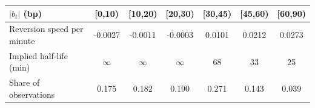 \begin{tabular}{lcccccc}
\toprule
$|b_t|$ (bp) & [0,10) & [10,20) & [20,30) & [30,45) & [45,60) & [60,90) \\
\midrule
Reversion speed per minute & -0.0027 & -0.0011 & -0.0003 & 0.0101 & 0.0212 & 0.0273 \\
Implied half-life (min) & $\infty$ & $\infty$ & $\infty$ & 68 & 33 & 25 \\
Share of observations & 0.175 & 0.182 & 0.190 & 0.271 & 0.143 & 0.039 \\
\bottomrule
\end{tabular}
